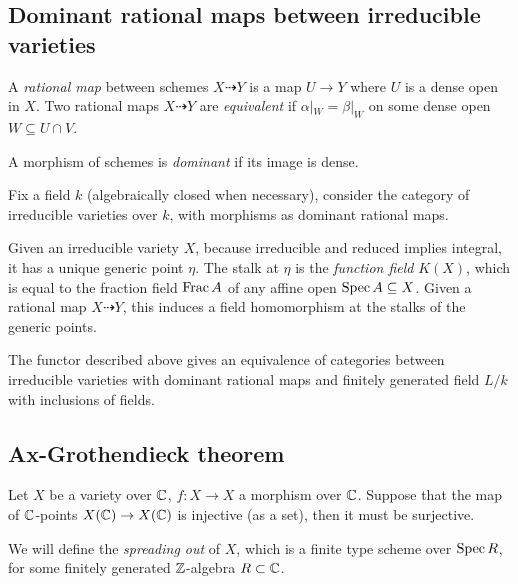 \documentclass[11pt]{amsart}
\begin{document}
\subsection{Dominant rational maps between irreducible varieties}

\begin{defn}
A \emph{rational map} between schemes $X\dashrightarrow Y$ is a map $U\to Y$ where $U$ is a dense open in $X$. Two rational maps $X\dashrightarrow Y$ are \emph{equivalent} if $\alpha|_W = \beta|_W$ on some dense open $W\subseteq U\cap V$.
\end{defn}

\begin{defn}
A morphism of schemes is \emph{dominant} if its image is dense.
\end{defn}

Fix a field $k$ (algebraically closed when necessary), consider the category of irreducible varieties over $k$, with morphisms as dominant rational maps.

Given an irreducible variety $X$, because irreducible and reduced implies integral, it has a unique generic point $\eta$. The stalk at $\eta$ is the \emph{function field} $K(X)$, which is equal to the fraction field $\operatorname{Frac} A$ of any affine open $\operatorname{Spec} A\subseteq X$. Given a rational map $X\dashrightarrow Y$, this induces a field homomorphism at the stalks of the generic points.

\begin{thm}
The functor described above gives an equivalence of categories between irreducible varieties with dominant rational maps and finitely generated field $L/k$ with inclusions of fields.
\end{thm}

\subsection{Ax-Grothendieck theorem}

\begin{thm}[Ax-Grothendieck]
Let $X$ be a variety over $\mathbb{C}$, $f:X\to X$ a morphism over $\mathbb{C}$. Suppose that the map of $\mathbb{C}$-points $X(\mathbb{C})\to X(\mathbb{C})$ is injective (as a set), then it must be surjective.
\end{thm}


We will define the \emph{spreading out} of $X$, which is a finite type scheme over $\operatorname{Spec} R$, for some finitely generated $\mathbb{Z}$-algebra $R\subset \mathbb{C}$. 
\end{document}
